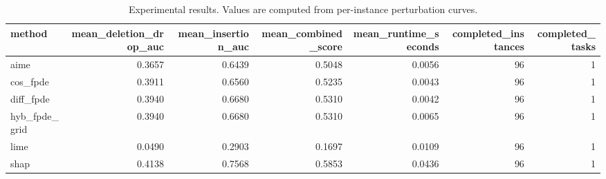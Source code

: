 \begin{table}[t]
\caption{Experimental results. Values are computed from per-instance perturbation curves.}
\label{tab:main_results_computed}
\centering
\begin{tabular}{lrrrrrr}
\toprule
method & mean\_deletion\_drop\_auc & mean\_insertion\_auc & mean\_combined\_score & mean\_runtime\_seconds & completed\_instances & completed\_tasks \\
\midrule
aime & 0.3657 & 0.6439 & 0.5048 & 0.0056 & 96 & 1 \\
cos\_fpde & 0.3911 & 0.6560 & 0.5235 & 0.0043 & 96 & 1 \\
diff\_fpde & 0.3940 & 0.6680 & 0.5310 & 0.0042 & 96 & 1 \\
hyb\_fpde\_grid & 0.3940 & 0.6680 & 0.5310 & 0.0065 & 96 & 1 \\
lime & 0.0490 & 0.2903 & 0.1697 & 0.0109 & 96 & 1 \\
shap & 0.4138 & 0.7568 & 0.5853 & 0.0436 & 96 & 1 \\
\bottomrule
\end{tabular}

\end{table}
